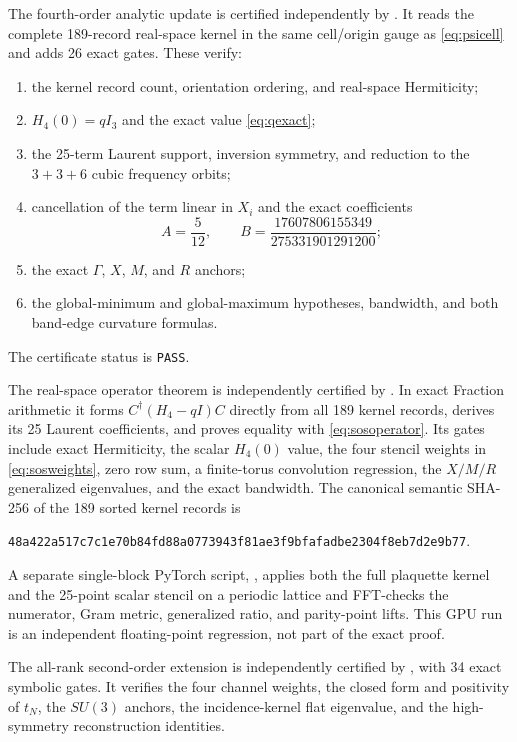\documentclass[11pt]{article}
\begin{document}
The fourth-order analytic update is certified independently by
. It reads the
complete 189-record real-space kernel in the same cell/origin gauge as
\eqref{eq:psicell} and adds 26 exact gates. These verify:
\begin{enumerate}
\item the kernel record count, orientation ordering, and real-space
Hermiticity;
\item $H_4(0)=qI_3$ and the exact value \eqref{eq:qexact};
\item the 25-term Laurent support, inversion symmetry, and reduction to the
$3+3+6$ cubic frequency orbits;
\item cancellation of the term linear in $X_i$ and the exact coefficients
\[
A=\frac5{12},\qquad
B=\frac{17607806155349}{275331901291200};
\]
\item the exact $\Gamma$, $X$, $M$, and $R$ anchors;
\item the global-minimum and global-maximum hypotheses, bandwidth, and both
band-edge curvature formulas.
\end{enumerate}
The certificate status is \texttt{PASS}.

The real-space operator theorem is independently certified by
. In exact Fraction arithmetic
it forms $C^\dagger(H_4-qI)C$ directly from all 189 kernel records, derives
its 25 Laurent coefficients, and proves equality with
\eqref{eq:sosoperator}. Its gates include exact Hermiticity, the scalar
$H_4(0)$ value, the four stencil weights in \eqref{eq:sosweights}, zero row
sum, a finite-torus convolution regression, the $X/M/R$ generalized
eigenvalues, and the exact bandwidth. The canonical semantic SHA-256 of the
189 sorted kernel records is
\begin{center}
\texttt{48a422a517c7c1e70b84fd88a0773943f81ae3f9bfafadbe2304f8eb7d2e9b77}.
\end{center}
A separate single-block PyTorch script,
, applies both the full plaquette kernel and
the 25-point scalar stencil on a periodic lattice and FFT-checks the numerator,
Gram metric, generalized ratio, and parity-point lifts. This GPU run is an
independent floating-point regression, not part of the exact proof.

The all-rank second-order extension is independently certified by
, with 34 exact symbolic
gates. It verifies the four channel weights, the closed form and positivity
of $t_N$, the $SU(3)$ anchors, the incidence-kernel flat eigenvalue, and the
high-symmetry reconstruction identities.
\end{document}
